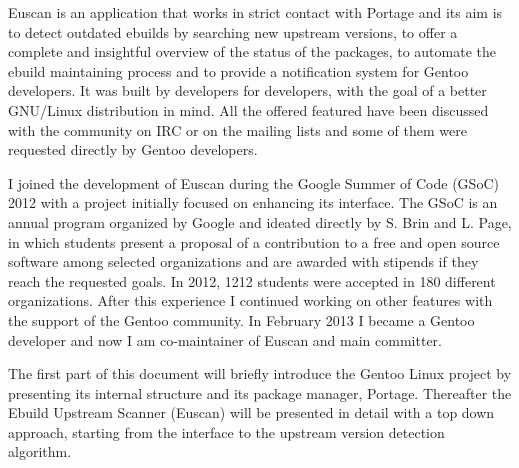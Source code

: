 Euscan is an application that works in strict contact with Portage and its aim is to detect outdated ebuilds by searching new upstream versions, to offer a complete and insightful overview of the status of the packages, to automate the ebuild maintaining process and to provide a notification system for Gentoo developers.
It was built by developers for developers, with the goal of a better GNU/Linux distribution in mind. All the offered featured have been discussed with the community on IRC or on the mailing lists and some of them were requested directly by Gentoo developers.

I joined the development of Euscan during the Google Summer of Code (GSoC) 2012 with a project initially focused on enhancing its interface. The GSoC is an annual program organized by Google and ideated directly by S. Brin and L. Page, in which students present a proposal of a contribution to a free and open source software among selected organizations and are awarded with stipends if they reach the requested goals. In 2012, 1212 students were accepted in 180 different organizations\cite{gsoc2012}.
After this experience I continued working on other features with the support of the Gentoo community. In February 2013 I became a Gentoo developer and now I am co-maintainer of Euscan and main committer.


The first part of this document will briefly introduce the Gentoo Linux project by presenting its internal structure and its package manager, Portage.
Thereafter the Ebuild Upstream Scanner (Euscan) will be presented in detail with a top down approach, starting from the interface to the upstream version detection algorithm.